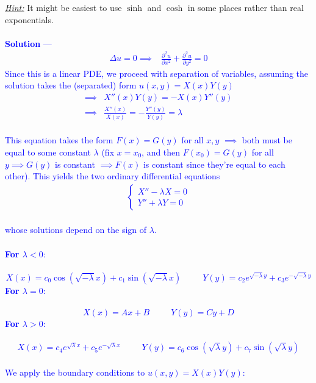 \documentclass[12pt]{article}
\begin{document}
\noindent \underline{\emph{Hint:}} It might be easiest to use $\sinh$ and $\cosh$ in some places rather than real exponentials. \\ \\
\textcolor{blue}{\textbf{Solution} — 
\begin{align*}
\Delta u = 0 \implies& \frac{\partial^2 u}{\partial x^2} + \frac{\partial^2 u}{\partial y^2} = 0
\end{align*}
Since this is a linear PDE, we proceed with separation of variables, assuming the solution takes the (separated) form $u(x,y) = X(x)Y(y)$ \\
\begin{align*}
\implies& X''(x)Y(y) = -X(x)Y''(y) \\
\implies& \frac{X''(x)}{X(x)} = -\frac{Y''(y)}{Y(y)} = \lambda
\end{align*} \\
This equation takes the form $F(x) = G(y)$ for all $x,y$ $\implies$ both must be equal to some constant $\lambda$ (fix $x = x_0$, and then $F(x_0) = G(y)$ for all $y \implies G(y)$ is constant $\implies F(x)$ is constant since they're equal to each other). This yields the two ordinary differential equations
\begin{align*}
\begin{cases}
X'' - \lambda X = 0 \\
Y'' + \lambda Y = 0
\end{cases}
\end{align*} \\
whose solutions depend on the sign of $\lambda$. \\ \\
\textbf{For $\lambda < 0$}: \\ \\
$$X(x) = c_0 \cos \left( \sqrt{-\lambda} x \right) + c_1 \sin \left( \sqrt{-\lambda} x \right) \;\;\;\;\;\;\;\;\; Y(y) = c_2 e^{\sqrt{-\lambda} y} + c_3 e^{-\sqrt{-\lambda} y}$$
\textbf{For $\lambda = 0$}: \\ \\
$$X(x) = Ax + B \;\;\;\;\;\;\;\;\; Y(y) = Cy + D$$
\textbf{For $\lambda > 0$}: \\ \\
$$X(x) = c_4 e^{\sqrt{\lambda} x} + c_5 e^{-\sqrt{\lambda} x} \;\;\;\;\;\;\;\;\; Y(y) = c_6 \cos \left( \sqrt{\lambda} y \right) + c_7 \sin \left( \sqrt{\lambda} y \right)$$ \\
We apply the boundary conditions to $u(x,y) = X(x)Y(y)$: \\ \\
}
\end{document}
